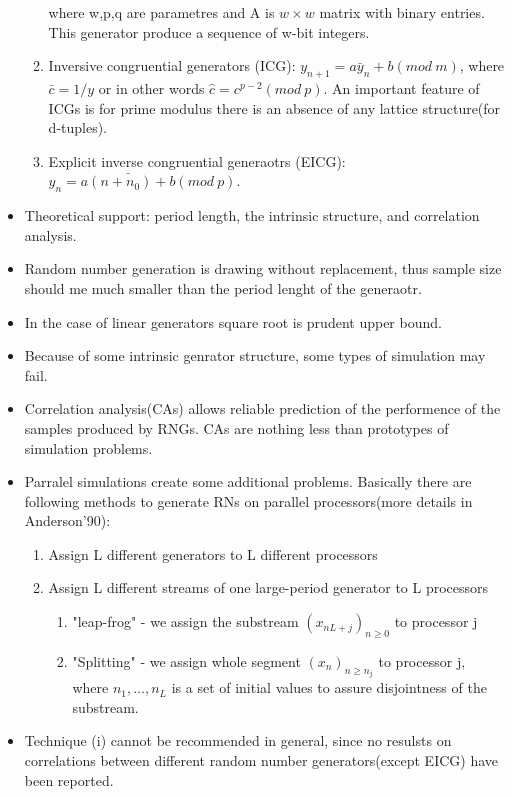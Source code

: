 \documentclass[10pt,a4paper]{article}
\begin{document}
\begin{itemize}
\begin{enumerate}
 where w,p,q are parametres and A is $w\times w$ matrix with binary entries. This generator produce a sequence of w-bit integers.
 \item Inversive congruential generators (ICG): $y_{n+1} = a\bar{y}_{n} + b (mod ~ m)$, where $\bar{c} = 1/y$ or in other words $\hat{c} = c^{p-2} (mod ~ p)$.
 An important feature of ICGs is for prime modulus there is an absence of any lattice structure(for d-tuples).
 \item Explicit inverse congruential generaotrs (EICG): $y_{n} = \bar{a(n + n_0) + b} (mod ~ p)$.
\end{enumerate}
\item Theoretical support: period length, the intrinsic structure, and correlation analysis.
\item Random number generation is drawing without replacement, thus sample size should me much smaller than the period lenght of the generaotr.
\item In the case of linear generators square root is prudent upper bound.
\item Because of some intrinsic genrator structure, some types of simulation may fail.
\item Correlation analysis(CAs) allows reliable prediction of the performence of the samples produced by RNGs. 
CAs are nothing less than prototypes of simulation problems.
\item Parralel simulations create some additional problems. Basically there are following methods to generate RNs on parallel processors(more details in Anderson'90):
\begin{enumerate}
 \item Assign L different generators to L different processors
 \item Assign L different streams of one large-period generator to L processors
 \begin{enumerate}
  \item "leap-frog" - we assign the substream $(x_{nL+j})_{n\ge0}$ to processor j
  \item "Splitting" - we assign whole segment $(x_n)_{n\ge n_j}$ to processor j, where $n_1,...,n_L$ is a set of initial values to assure disjointness of the substream.
 \end{enumerate}
\end{enumerate}
\item Technique (i) cannot be recommended in general, since no resulsts on correlations between different random number generators(except EICG) have been reported.

\end{itemize}
\end{document}
